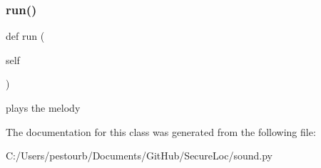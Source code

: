 \subsubsection{\texorpdfstring{run()}{run()}}
{\footnotesize\ttfamily def run (\begin{DoxyParamCaption}\item[{}]{self }\end{DoxyParamCaption})}

\begin{DoxyVerb}plays the melody\end{DoxyVerb}
 

The documentation for this class was generated from the following file\+:\begin{DoxyCompactItemize}
\item 
C\+:/\+Users/pestourb/\+Documents/\+Git\+Hub/\+Secure\+Loc/sound.\+py\end{DoxyCompactItemize}
